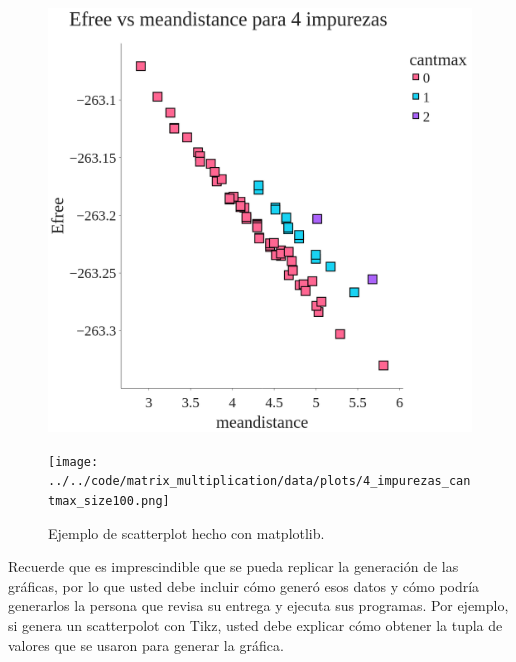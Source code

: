 \begin{figure}[H]
    \centering
    \begin{minipage}[t]{0.5\textwidth}
        \includegraphics[width=\textwidth]{../../code/matrix_multiplication/data/plots/4_impurezas_cantmax_size10.png}
    \end{minipage}%
    \begin{minipage}[t]{0.5\textwidth}
        \texttt{[image: ../../code/matrix\_multiplication/data/plots/4\_impurezas\_cantmax\_size100.png]}
     \end{minipage}%
    \caption{Ejemplo de scatterplot hecho con matplotlib.}
    \label{fig:scatterplot_3}
\end{figure}





\begin{mdframed}
    Recuerde que es imprescindible que se pueda replicar la generación de las gráficas, por lo que usted debe incluir cómo generó esos datos y  cómo podría generarlos la persona que revisa su entrega y ejecuta sus programas. Por ejemplo, si genera un scatterpolot con Tikz, usted debe explicar cómo obtener la tupla de valores que se usaron para generar la gráfica.
\end{mdframed}
